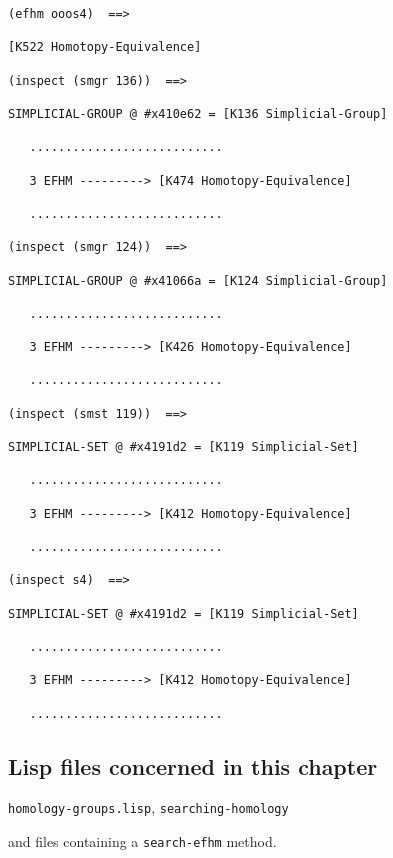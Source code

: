 {\begin{verbatim}
(efhm ooos4)  ==>

[K522 Homotopy-Equivalence]

(inspect (smgr 136))  ==>

SIMPLICIAL-GROUP @ #x410e62 = [K136 Simplicial-Group]

   ...........................

   3 EFHM ---------> [K474 Homotopy-Equivalence]

   ...........................

(inspect (smgr 124))  ==>

SIMPLICIAL-GROUP @ #x41066a = [K124 Simplicial-Group]

   ...........................

   3 EFHM ---------> [K426 Homotopy-Equivalence]

   ...........................

(inspect (smst 119))  ==>

SIMPLICIAL-SET @ #x4191d2 = [K119 Simplicial-Set]

   ...........................

   3 EFHM ---------> [K412 Homotopy-Equivalence]

   ...........................

(inspect s4)  ==>

SIMPLICIAL-SET @ #x4191d2 = [K119 Simplicial-Set]

   ...........................

   3 EFHM ---------> [K412 Homotopy-Equivalence]

   ...........................

\end{verbatim}}



\subsection* {Lisp files concerned in this chapter}

{\tt homology-groups.lisp}, {\tt searching-homology}\par
and files containing a {\tt search-efhm} method.